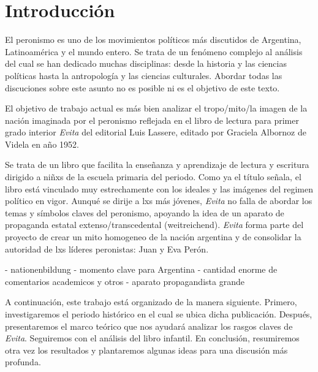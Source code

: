 \section{Introducción}
El peronismo es uno de los movimientos políticos más discutidos de Argentina, Latinoamérica y el mundo entero.
Se trata de un fenómeno complejo al análisis del cual se han dedicado muchas disciplinas: desde la historia y las ciencias políticas hasta la antropología y las ciencias culturales.
Abordar todas las discuciones sobre este asunto no es posible ni es el objetivo de este texto.

El objetivo de trabajo actual es más bien analizar el tropo/mito/la imagen de la nación imaginada por el peronismo reflejada en el libro de lectura para primer grado interior \textit{Evita} del editorial Luis Lassere, editado por Graciela Albornoz de Videla en año 1952.

Se trata de un libro que facilita la enseñanza y aprendizaje de lectura y escritura dirigido a niñxs de la escuela primaria del periodo.
Como ya el título señala, el libro está vinculado muy estrechamente con los ideales y las imágenes del regimen político en vigor.
Aunqué se dirije a lxs más jóvenes, \textit{Evita} no falla de abordar los temas y símbolos claves del peronismo, apoyando la idea de un aparato de propaganda estatal extenso/transcedental (weitreichend).
\textit{Evita} forma parte del proyecto de crear un mito homogeneo de la nación argentina
y de consolidar la autoridad de lxs líderes peronistas: Juan y Eva Perón.


- nationenbildung
- momento clave para Argentina
- cantidad enorme de comentarios academicos y otros
- aparato propagandista grande


A continuación, este trabajo está organizado de la manera siguiente.
Primero, investigaremos el periodo histórico en el cual se ubica dicha publicación.
Después, presentaremos el marco teórico que nos ayudará analizar los rasgos claves de \textit{Evita}.
Seguiremos con el análisis del libro infantil.
En conclusión, resumiremos otra vez los resultados y plantaremos algunas ideas para una discusión más profunda.

